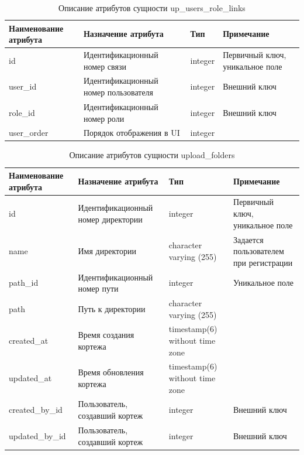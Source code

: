 \documentclass{mirea}
\begin{document}
	\begin{longtable}{ |p{}|p{}|p{}|p{}| } 
		\caption{Описание атрибутов сущности up\_users\_role\_links}
		\endfirsthead
		\endhead
		\hline
		Наименование атрибута & Назначение атрибута & Тип & Примечание \\ \hline
		
		id & Идентификацион\-ный номер связи & integer & Первичный ключ, уникальное поле \\ \hline
		
		user\_id & Идентификацион\-ный номер пользователя & integer & Внешний ключ \\ \hline
		
		role\_id & Идентификационный номер роли & integer & Внешний ключ \\ \hline
		
		user\_order & Порядок отображения в UI & integer & \\ \hline
		
	\end{longtable}

	\begin{longtable}{ |p{}|p{}|p{}|p{}| } 
		\caption{Описание атрибутов сущности upload\_folders}
		\endfirsthead
		\endhead
		\hline
		Наименование атрибута & Назначение атрибута & Тип & Примечание \\ \hline
		
		id & Идентификацион\-ный номер директории & integer & Первичный ключ, уникальное поле \\ \hline
		
		name & Имя директории & character varying (255) & Задается пользователем при регистрации \\ \hline
		
		path\_id & Идентификацион\-ный номер пути & integer & Уникальное поле \\ \hline
		
		path & Путь к директории & character varying (255) &  \\ \hline
		
		created\_at & Время создания кортежа & timestamp(6) without time zone & \\ \hline
		
		updated\_at & Время обновления кортежа & timestamp(6) without time zone & \\ \hline
		
		created\_by\_id & Пользователь, создавший кортеж & integer & Внешний ключ \\ \hline
		
		updated\_by\_id & Пользователь, создавший кортеж & integer & Внешний ключ \\ \hline
		
	\end{longtable}
\end{document}
